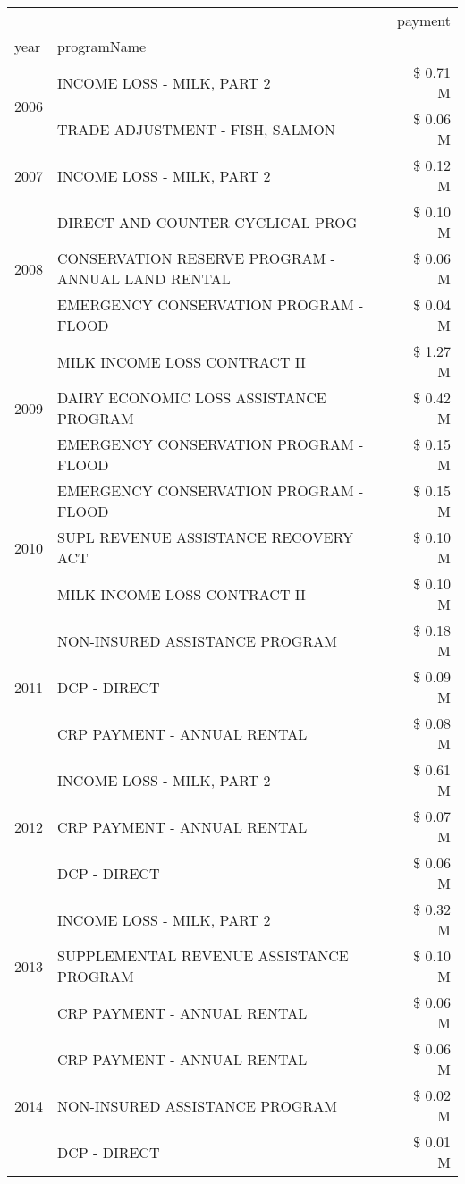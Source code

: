\begin{tabular}{llr}
\toprule
 &  & payment \\
year & programName &  \\
\midrule
\multirow[t]{2}{*}{2006} & INCOME LOSS - MILK, PART 2 & \$ 0.71 M \\
 & TRADE ADJUSTMENT - FISH, SALMON & \$ 0.06 M \\
\cline{1-3}
2007 & INCOME LOSS - MILK, PART 2 & \$ 0.12 M \\
\cline{1-3}
\multirow[t]{3}{*}{2008} & DIRECT AND COUNTER CYCLICAL PROG & \$ 0.10 M \\
 & CONSERVATION RESERVE PROGRAM - ANNUAL LAND RENTAL & \$ 0.06 M \\
 & EMERGENCY CONSERVATION PROGRAM - FLOOD & \$ 0.04 M \\
\cline{1-3}
\multirow[t]{3}{*}{2009} & MILK INCOME LOSS CONTRACT II & \$ 1.27 M \\
 & DAIRY ECONOMIC LOSS ASSISTANCE PROGRAM & \$ 0.42 M \\
 & EMERGENCY CONSERVATION PROGRAM - FLOOD & \$ 0.15 M \\
\cline{1-3}
\multirow[t]{3}{*}{2010} & EMERGENCY CONSERVATION PROGRAM - FLOOD & \$ 0.15 M \\
 & SUPL REVENUE ASSISTANCE RECOVERY ACT & \$ 0.10 M \\
 & MILK INCOME LOSS CONTRACT II & \$ 0.10 M \\
\cline{1-3}
\multirow[t]{3}{*}{2011} & NON-INSURED ASSISTANCE PROGRAM & \$ 0.18 M \\
 & DCP - DIRECT & \$ 0.09 M \\
 & CRP PAYMENT - ANNUAL RENTAL & \$ 0.08 M \\
\cline{1-3}
\multirow[t]{3}{*}{2012} & INCOME LOSS - MILK, PART 2 & \$ 0.61 M \\
 & CRP PAYMENT - ANNUAL RENTAL & \$ 0.07 M \\
 & DCP - DIRECT & \$ 0.06 M \\
\cline{1-3}
\multirow[t]{3}{*}{2013} & INCOME LOSS - MILK, PART 2 & \$ 0.32 M \\
 & SUPPLEMENTAL REVENUE ASSISTANCE PROGRAM & \$ 0.10 M \\
 & CRP PAYMENT - ANNUAL RENTAL & \$ 0.06 M \\
\cline{1-3}
\multirow[t]{3}{*}{2014} & CRP PAYMENT - ANNUAL RENTAL & \$ 0.06 M \\
 & NON-INSURED ASSISTANCE PROGRAM & \$ 0.02 M \\
 & DCP - DIRECT & \$ 0.01 M \\

\end{tabular}
